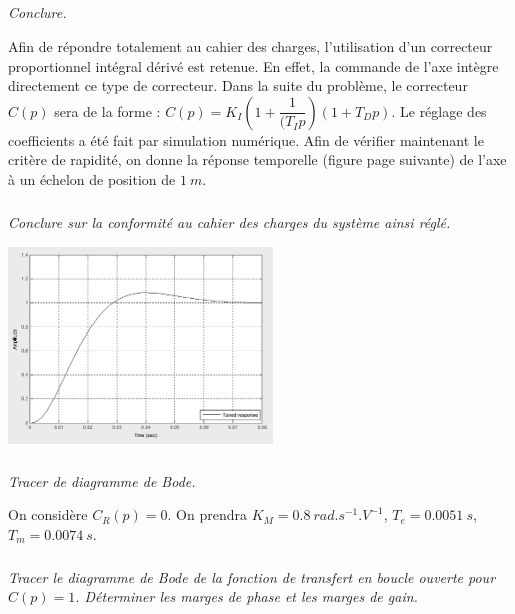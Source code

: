 \documentclass[10pt,fleqn]{article} %
\begin{document}
\begin{multicols}{2}
\subparagraph{}
\textit{Conclure.}
\ifprof
\begin{corrige}
\end{corrige}
\else
\fi

\ifprof
\else

Afin de répondre totalement au cahier des charges, l'utilisation d'un correcteur proportionnel intégral dérivé est retenue. En effet, la commande de l'axe intègre directement ce type de correcteur. Dans la suite du problème, le correcteur $C(p)$ sera de la forme : $C(p)=K_I \left(1+\dfrac{1}{(T_I p}\right)\left(1+T_D p\right)$. Le réglage des coefficients a été fait par simulation numérique.
Afin de vérifier maintenant le critère de rapidité, on donne la réponse temporelle (figure page suivante) de l'axe à un échelon de position de $\SI{1}{m}$.

\fi

\subparagraph{}
\textit{Conclure sur la conformité au cahier des charges du système ainsi réglé.}
\ifprof
\begin{corrige}
\end{corrige}
\else
\fi

\ifprof
\else
 
 \begin{center}
\includegraphics[width=7cm]{images/image11}
\end{center} 

\fi
 

\subparagraph{}
\textit{Tracer de diagramme de Bode.}
\ifprof
\begin{corrige}
\end{corrige}
\else
\fi

\ifprof
\else

On considère $C_R (p)=0$. On prendra $K_M=\SI{0,8}{rad.s^{-1}.V^{-1}}$, $T_e=\SI{0,0051}{s}$,$T_m=\SI{0,0074}{s}$.
\fi

\subparagraph{}
\textit{Tracer le diagramme de Bode de la fonction de transfert en boucle ouverte pour $C(p)=1$. Déterminer les marges de phase et les marges de gain.}
\ifprof
\begin{corrige}
\end{corrige}
\else
\fi
 

\end{multicols}
\end{document}
